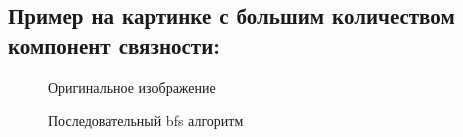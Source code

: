 \documentclass{report}
\begin{document}
\subsection*{Пример на картинке с большим количеством компонент связности:} 

\begin{figure}[H]
\caption{Оригинальное изображение}
\end{figure}
\begin{figure}[H]
\caption{Последовательный bfs алгоритм}
\end{figure}
\end{document}
